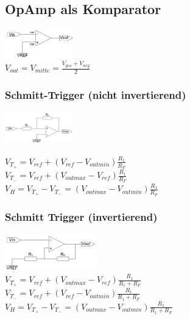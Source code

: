 \documentclass[margin=normal]{tex/hsrzf}
\begin{document}
\endgroup

\begin{multicols}{2}
  \subsection{OpAmp als Komparator}
  \includegraphics[width=3cm]{img/OpAmp/Komparator.png}\\
  $V_{out} = V_{mitte} = \frac{V_{pos} + V_{neg}}{2}$
  \subsubsection*{Schmitt-Trigger (nicht invertierend)}

  \includegraphics[width=3cm]{img/OpAmp/Schmitt-Trigger_nicht_invertierend.png}


  $V_{T_+} = V_{ref} + (V_{ref} - V_{out min})\frac{R_1}{R_F} $ \\
  $V_{T_-} = V_{ref} + (V_{out max} - V_{ref})\frac{R_1}{R_F} $\\
  $V_H = V_{T_+} - V_{T_-} = (V_{outmax} - V_{outmin})\frac{R_1}{R_F}$

  \subsubsection*{Schmitt Trigger (invertierend)}
  \includegraphics[width=4cm]{img/OpAmp/Schmitt-Trigger_invertierend.png}\\
  $V_{T_+} = V_{ref} + (V_{out max} - V_{ref})\frac{R_1}{R_1 + R_F} $ \\
  $V_{T_-} = V_{ref} + (V_{ref} - V_{out min})\frac{R_1}{R_1 + R_F} $\\
  $V_H = V_{T_+} - V_{T_-} = (V_{outmax} - V_{outmin})\frac{R_1}{R_1+R_F}$
\end{multicols}
\end{document}
